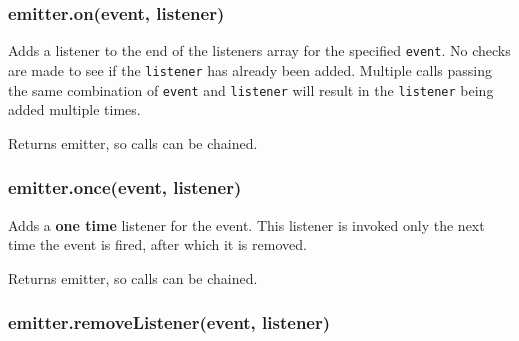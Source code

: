 \subsubsection{emitter.on(event,
listener)}\label{emitter.onevent-listener}

Adds a listener to the end of the listeners array for the specified
\texttt{event}. No checks are made to see if the \texttt{listener} has
already been added. Multiple calls passing the same combination of
\texttt{event} and \texttt{listener} will result in the
\texttt{listener} being added multiple times.

\begin{Shaded}
\begin{Highlighting}[]
\NormalTok{(}\NormalTok{, } 
  \NormalTok{(}\NormalTok{);}
\NormalTok{\});}
\end{Highlighting}
\end{Shaded}

Returns emitter, so calls can be chained.

\subsubsection{emitter.once(event,
listener)}\label{emitter.onceevent-listener}

Adds a \textbf{one time} listener for the event. This listener is
invoked only the next time the event is fired, after which it is
removed.

\begin{Shaded}
\begin{Highlighting}[]
\NormalTok{(}\NormalTok{, } 
  \NormalTok{(}\NormalTok{);}
\NormalTok{\});}
\end{Highlighting}
\end{Shaded}

Returns emitter, so calls can be chained.

\subsubsection{emitter.removeListener(event,
listener)}\label{emitter.removelistenerevent-listener}

